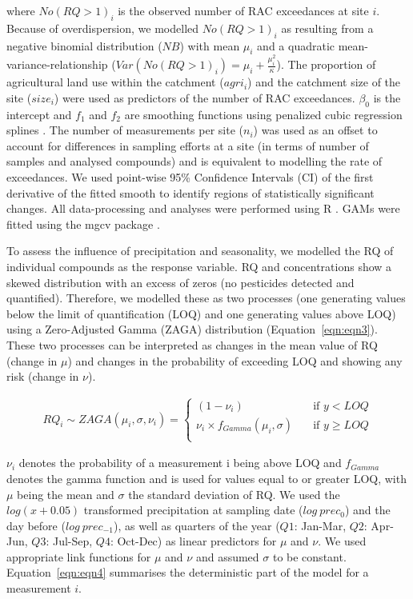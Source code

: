 \documentclass[journal=esthag,manuscript=article]{achemso}
\begin{document}
where $No(RQ > 1)_i$ is the observed number of RAC exceedances at site $i$. 
Because of overdispersion, we modelled $No(RQ > 1)_i$ as resulting from a negative binomial distribution ($NB$) with mean $\mu_i$ and a quadratic mean-variance-relationship ($Var(No(RQ > 1)_i) = \mu_i + \frac{\mu_i^2}{\kappa}$). 
The proportion of agricultural land use within the catchment ($agri_i$) and the catchment size of the site ($size_i$) were used as predictors of the number of RAC exceedances. 
$\beta_0$ is the intercept and $f_1$ and $f_2$ are smoothing functions using penalized cubic regression splines \citep{wood_generalized_2006, wood_fast_2011}. 
The number of measurements per site ($n_i$) was used as an offset to account for differences in sampling efforts  at a site (in terms of number of samples and analysed compounds) and is equivalent to modelling the rate of exceedances. 
We used point-wise 95\% Confidence Intervals (CI) of the first derivative of the fitted smooth to identify regions of statistically significant changes.
All data-processing and analyses were performed using R \citep{r_core_team_r:_2016}.
GAMs were fitted using the mgcv package \citep{wood_fast_2011}.

To assess the influence of precipitation and seasonality, we modelled the RQ of individual compounds as the response variable.
RQ and concentrations show a skewed distribution with an excess of zeros (no pesticides detected and quantified). 
Therefore, we modelled these as two processes (one generating values below the limit of quantification (LOQ) and one generating values above LOQ) using a Zero-Adjusted Gamma (ZAGA) distribution \cite{rigby_generalized_2005,stasinopoulos_gamlss.dist:_2016} (Equation~\ref{eqn:eqn3}).
These two processes can be interpreted as changes in the mean value of RQ (change in $\mu$) and changes in the probability of exceeding LOQ and showing any risk (change in $\nu$).

\begin{align}
RQ_i \sim ZAGA(\mu_i, \sigma, \nu_i) = 
  \begin{cases}
    (1 - \nu_i)   & \quad  \text{if } y < LOQ \\
    \nu_i \times f_{Gamma} (\mu_i, \sigma) & \quad \text{if } y \ge LOQ \\
  \end{cases}
  \label{eqn:eqn3}
\end{align}

$\nu_i$ denotes the probability of a measurement i being above LOQ and $f_{Gamma}$ denotes the gamma function and is used for values equal to or greater LOQ, with $\mu$ being the mean and $\sigma$ the standard deviation of RQ.
We used the $log(x+0.05)$ transformed precipitation at sampling date ($log~prec_0$) and the day before ($log~prec_{-1}$), as well as quarters of the year ($Q1$: Jan-Mar, $Q2$: Apr-Jun, $Q3$: Jul-Sep, $Q4$: Oct-Dec) as linear predictors for $\mu$ and $\nu$. 
We used appropriate link functions for $\mu$ and $\nu$ and assumed $\sigma$ to be constant. 
Equation~\ref{eqn:eqn4} summarises the deterministic part of the model for a measurement $i$.
\end{document}
